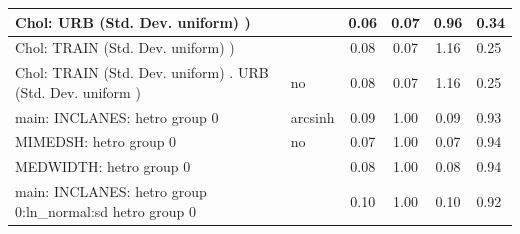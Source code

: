 \begin{table}
\begin{center}
\begin{tabular}{|l|l|c|c|c|l|}
			\hline
			 Chol: URB (Std. Dev. uniform) ) &  & 0.06 & 0.07 & 0.96 & 0.34 \\
			\hline
			 Chol: TRAIN (Std. Dev. uniform) ) &  & 0.08 & 0.07 & 1.16 & 0.25 \\
			\hline
			 Chol: TRAIN (Std. Dev. uniform) . URB (Std. Dev.   uniform ) & no & 0.08 & 0.07 & 1.16 & 0.25 \\
			\hline
			main: INCLANES: hetro group 0 & arcsinh & 0.09 & 1.00 & 0.09 & 0.93 \\
			\hline
			MIMEDSH: hetro group 0 & no & 0.07 & 1.00 & 0.07 & 0.94 \\
			\hline
			MEDWIDTH: hetro group 0 &  & 0.08 & 1.00 & 0.08 & 0.94 \\
			\hline
			main: INCLANES: hetro group 0:ln_normal:sd  hetro group 0 &  & 0.10 & 1.00 & 0.10 & 0.92 \\
			\hline
		\end{tabular}
	\end{center}
\end{table}